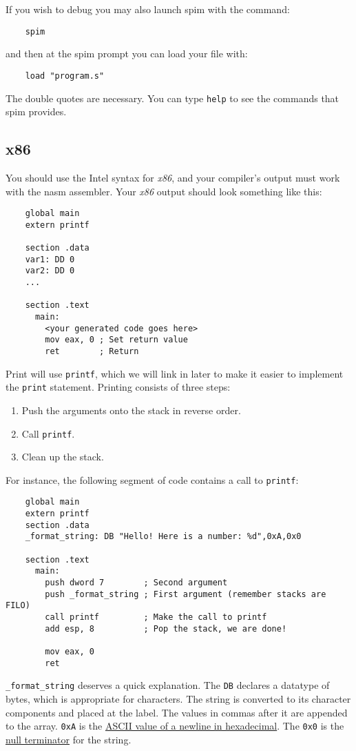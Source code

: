 \documentclass{article}
\newcommand{\code}[1]{\texttt{\textmd{#1}}}
\begin{document}
If you wish to debug you may also launch spim with the command:
\begin{lstlisting}
	spim
\end{lstlisting}
and then at the spim prompt you can load your file with:
\begin{lstlisting}
	load "program.s"
\end{lstlisting}
The double quotes are necessary. You can type \texttt{help} to see the commands that spim provides.

\subsection{x86}
You should use the Intel syntax for \textit{x86}, and your compiler's output must work with the
nasm assembler. Your \textit{x86} output should look something like this:

\begin{lstlisting}
	global main
	extern printf

	section .data
	var1: DD 0
	var2: DD 0
	...

	section .text
	  main:
	    <your generated code goes here>
	    mov eax, 0 ; Set return value
	    ret        ; Return
\end{lstlisting}

Print will use \code{printf}, which we will link in later to make it easier to implement the
\code{print} statement. Printing consists of three steps:
\begin{enumerate}
	\item Push the arguments onto the stack in reverse order.
	\item Call \code{printf}.
	\item Clean up the stack.
\end{enumerate}

For instance, the following segment of code contains a call to \code{printf}:
\begin{lstlisting}
	global main
	extern printf
	section .data
	_format_string: DB "Hello! Here is a number: %d",0xA,0x0

	section .text
	  main:
	    push dword 7        ; Second argument
	    push _format_string ; First argument (remember stacks are FILO)
	    call printf         ; Make the call to printf
	    add esp, 8          ; Pop the stack, we are done!

	    mov eax, 0
	    ret
\end{lstlisting}

\code{\_format\_string} deserves a quick explanation. The \code{DB} declares a datatype of bytes,
which is appropriate for characters. The string is converted to its character components and
placed at the label. The values in commas after it are appended to the array. \code{0xA} is the
\href{http://www.asciitable.com/}{ASCII value of a newline in hexadecimal}. The \code{0x0} is the
\href{https://en.wikipedia.org/wiki/Null-terminated_string}{null terminator} for the string.
\end{document}
